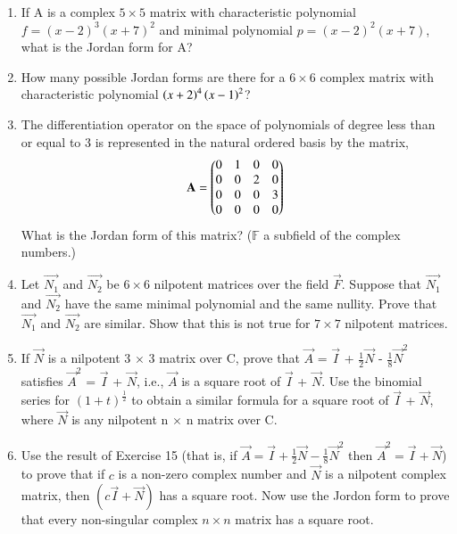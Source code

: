 \renewcommand{\theequation}{\theenumi}
\renewcommand{\thefigure}{\theenumi}
\begin{enumerate}[label=\thesubsection.\arabic*.,ref=\thesubsection.\theenumi]

\item If A is a complex $5 \times 5$ matrix with characteristic polynomial $f = (x-2)^3 (x+7)^2$ and minimal polynomial $p = (x-2)^2 (x+7)$, what is the Jordan form for A? 
%
\\
\solution

\item How many possible Jordan forms are there for a $6\times6$ complex matrix with characteristic polynomial $\left(x+2\right)^4\left(x-1\right)^2$?
%
\\
\solution


\item The differentiation operator on the space of polynomials of degree less than or equal to 3 is represented in the natural ordered basis by the matrix,
\begin{align}
\mathbf{A} = \begin{pmatrix}0&1&0&0\\0&0&2&0\\0&0&0&3\\0&0&0&0\end{pmatrix}
\end{align}
What is the Jordan form of this matrix? ($\mathbb{F}$ a subfield of the complex numbers.) 
%
%
\\
\solution

\item Let $\vec{N_1}$ and $\vec{N_2}$ be $6 \times 6$ nilpotent matrices over the field $\vec{F}$. Suppose that $\vec{N_1}$ and $\vec{N_2}$ have the same minimal polynomial and the same nullity. Prove that $\vec{N_1}$ and $\vec{N_2}$ are similar. Show that this is not true for $7 \times 7$ nilpotent matrices.
%
\\
\solution

\twocolumn
\item If $\vec{N}$ is a nilpotent 3 $\times$ 3 matrix over C, prove that $\vec{A}$ = $\vec{I}$ + $\frac{1}{2}\vec{N}$ - $\frac{1}{8}\vec{N}^{2}$ satisfies $\vec{A}^2$ = $\vec{I}$ + $\vec{N}$, i.e., $\vec{A}$ is a square root of $\vec{I}$ + $\vec{N}$. Use the binomial series for $(1 + t)^\frac{1}{2}$ to obtain a similar formula for a square root of $\vec{I}$ + $\vec{N}$, where $\vec{N}$ is any nilpotent n $\times$ n matrix over C.
%
\\
\solution

\item Use the result of Exercise 15 (that is, if $\vec{A}=\vec{I}+\frac{1}{2}\vec{N}-\frac{1}{8}\vec{N}^2$ then $\vec{A}^2 = \vec{I}+\vec{N}$) to prove that if $c$ is a non-zero complex number and $\vec{N}$ is a nilpotent complex matrix, then $(c\vec{I}+\vec{N})$ has a square root. Now use the Jordon form to prove that every non-singular complex $n \times n$ matrix has a square root.
\\
\solution



\end{enumerate}
